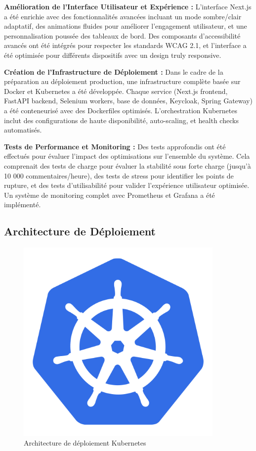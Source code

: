 \textbf{Amélioration de l'Interface Utilisateur et Expérience :} L'interface Next.js a été enrichie avec des fonctionnalités avancées incluant un mode sombre/clair adaptatif, des animations fluides pour améliorer l'engagement utilisateur, et une personnalisation poussée des tableaux de bord. Des composants d'accessibilité avancés ont été intégrés pour respecter les standards WCAG 2.1, et l'interface a été optimisée pour différents dispositifs avec un design truly responsive.

\textbf{Création de l'Infrastructure de Déploiement :} Dans le cadre de la préparation au déploiement production, une infrastructure complète basée sur Docker et Kubernetes a été développée. Chaque service (Next.js frontend, FastAPI backend, Selenium workers, base de données, Keycloak, Spring Gateway) a été conteneurisé avec des Dockerfiles optimisés. L'orchestration Kubernetes inclut des configurations de haute disponibilité, auto-scaling, et health checks automatisés.

\textbf{Tests de Performance et Monitoring :} Des tests approfondis ont été effectués pour évaluer l'impact des optimisations sur l'ensemble du système. Cela comprenait des tests de charge pour évaluer la stabilité sous forte charge (jusqu'à 10 000 commentaires/heure), des tests de stress pour identifier les points de rupture, et des tests d'utilisabilité pour valider l'expérience utilisateur optimisée. Un système de monitoring complet avec Prometheus et Grafana a été implémenté.

\subsection{Architecture de Déploiement}

\begin{figure}[H]
\centering
\includegraphics[width=0.9\textwidth]{assets/images/kubernetes.png}
\caption{Architecture de déploiement Kubernetes}
\label{fig:k8s-architecture}
\end{figure}

